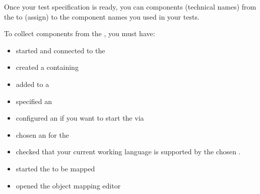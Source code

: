 
Once your test specification is ready, you can   components (technical names) from the \gdaut{} to  (assign) to the component names you used in your tests. 

To collect components from the \gdaut{}, you must have: 

\begin{itemize}
\item started and connected to the \gdagent{} 
\item created a \gdcase{} containing \gdsteps{} 
\item added \gdcases to a \gdsuite{} 
\item specified an \gdaut{}  
\item configured an \gdaut{}  if you want to start the \gdaut{} via \app{}
\item chosen an \gdaut{} for the \gdsuite{} 
\item checked that your current working language is supported by the chosen \gdaut{}. 
\item started the \gdaut{} to be mapped 
\item opened the object mapping editor 
\end{itemize}


